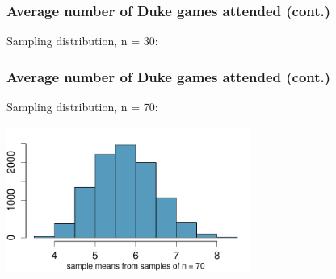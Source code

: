 \documentclass[11pt,containsverbatim,handout,xcolor=xelatex,dvipsnames,table]{beamer}
\newcommand{\soln}[1]{}
\begin{document}

\begin{frame}[fragile]
\frametitle{Average number of Duke games attended (cont.)}

Sampling distribution, n = 30:

{
\soln{\only<2->{Shape is more symmetric, center is about the same, spread is smaller.}}
}

\end{frame}


\begin{frame}[fragile]
\frametitle{Average number of Duke games attended (cont.)}

Sampling distribution, n = 70:

\begin{center}
\includegraphics[width=0.6\textwidth]{figures/duke_games/hist_duke_games_sampling70}
\end{center}

\end{frame}
\end{document}
